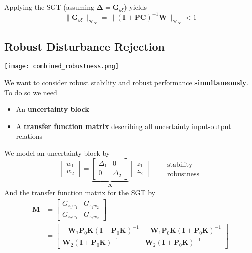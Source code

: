 Applying the SGT (assuming $\boldsymbol{\Delta}=\mathbf{G}_{y\xi}$) yields
\begin{equation*}
    \|\mathbf{G}_{y\xi}\|_{\mathcal{H}_\infty}=\|{(\mathbf{I}+\mathbf{PC})}^{-1}\mathbf{W}\|_{\mathcal{H}_\infty}<1
\end{equation*}

\subsection{Robust Disturbance Rejection}
\begin{center}
    \texttt{[image: combined\_robustness.png]}
\end{center}
We want to consider robust stability and robust performance \textbf{simultaneously}. To do so we need
\begin{itemize}
    \item An \textbf{uncertainty block}
    \item A \textbf{transfer function matrix} describing all uncertainty input-output relations
\end{itemize}
We model an uncertainty block by
\begin{equation*}
    \begin{bmatrix}
        w_1 \\
        w_2
    \end{bmatrix}
    =\underbrace{\begin{bmatrix}
            \Delta_1 & 0        \\
            0        & \Delta_2
        \end{bmatrix}}_{\boldsymbol{\Delta}}
    \begin{bmatrix}z_1 \\
        z_2
    \end{bmatrix}\qquad
    \begin{matrix}
        \mathrm{stability} \\
        \mathrm{robustness}
    \end{matrix}
\end{equation*}
And the transfer function matrix for the SGT by
\begin{align*}
    \mathbf{M} & =
    \begin{bmatrix}
        G_{{z_{1}w_{1}}} & G_{{z_{1}w_{2}}} \\
        G_{{z_{2}w_{1}}} & G_{{z_{2}w_{2}}}
    \end{bmatrix}                                                                                                                                                                                                                  \\
               & =\begin{bmatrix}
                      -\mathbf{W}_1\mathbf{P}_0\mathbf{K}{(\mathbf{I}+\mathbf{P}_0\mathbf{K})}^{-1} & -\mathbf{W}_1 \mathbf{P}_0\mathbf{K}{(\mathbf{I}+\mathbf{P}_0\mathbf{K})}^{-1} \\
                      \mathbf{W}_2{(\mathbf{I}+\mathbf{P}_0\mathbf{K})}^{-1}                        & \mathbf{W}_2{(\mathbf{I}+\mathbf{P}_0\mathbf{K})}^{-1}
                  \end{bmatrix}
\end{align*}
